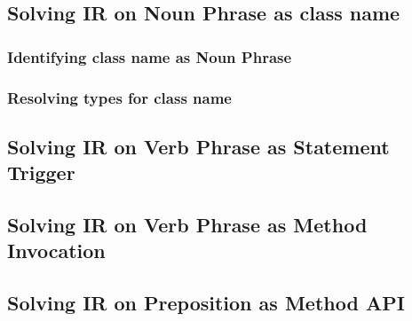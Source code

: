 \subsection{Solving IR on Noun Phrase as class name}
\subsubsection{Identifying  class name as Noun Phrase}
\subsubsection{Resolving types for  class name}
\subsection{Solving IR on Verb Phrase as Statement Trigger}
\subsection{Solving IR on Verb Phrase as Method Invocation}
\subsection{Solving IR on Preposition as Method API}



